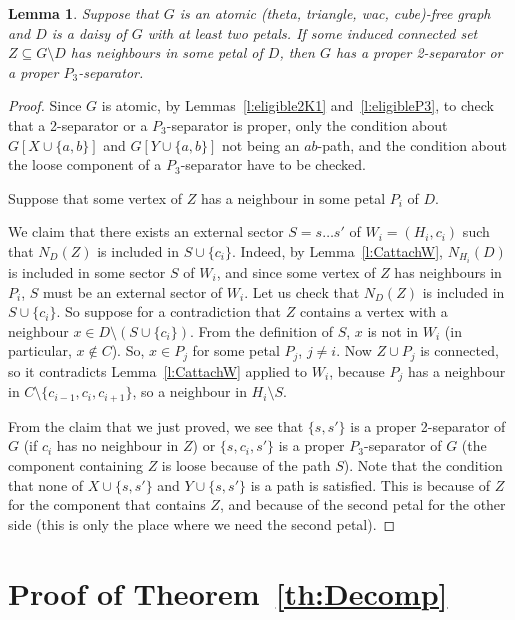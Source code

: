 \documentclass[11pt]{article}
\newtheorem{lemma}[theo]{Lemma}
\newcommand{\sm}{\setminus}
\begin{document}
\begin{lemma}
  \label{l:twoPetals}
  Suppose that $G$ is an atomic (theta, triangle, wac, cube)-free
  graph and $D$ is a daisy of $G$ with at least two petals.  If
  some induced connected set $Z\subseteq G \sm D$ has neighbours in some petal
  of $D$, then $G$ has a proper 2-separator or a proper
  $P_3$-separator.
\end{lemma}


\begin{proof}
  Since $G$ is atomic, by Lemmas~\ref{l:eligible2K1}
  and~\ref{l:eligibleP3}, to check that a 2-separator or a
  $P_3$-separator is proper, only the condition about
  $G[X\cup \{a, b\}]$ and $G[Y \cup \{a, b\}]$ not being an $ab$-path,
  and the condition about the loose component of a $P_3$-separator
  have to be checked.

  
  Suppose that some vertex of $Z$ has a neighbour in some petal $P_i$
  of $D$.

  We claim that there exists an external sector $S = s\dots s'$ of
  $W_i = (H_i, c_i)$ such that $N_{D}(Z)$ is included in $S\cup \{c_i\}$. Indeed, by
  Lemma~\ref{l:CattachW}, $N_{H_i}(D)$ is included in some sector $S$
  of $W_i$, and since some vertex of $Z$ has neighbours in $P_i$, $S$
  must be an external sector of $W_i$.  Let us check that $N_D(Z)$ is
  included in $S\cup \{c_i\}$.  So suppose for a contradiction that
  $Z$ contains a vertex with a neighbour $x\in D \sm (S\cup \{c_i\})$.
  From the definition of $S$, $x$ is not in $W_i$ (in particular,
  $x\notin C$).  So, $x\in P_j$ for some petal $P_j$, $j\neq i$.  Now
  $Z\cup P_j$ is connected, so it contradicts Lemma~\ref{l:CattachW}
  applied to $W_i$, because $P_j$ has a neighbour in
  $C \sm \{c_{i-1}, c_{i}, c_{i+1}\}$, so a neighbour in $H_i \sm S$.

  From the claim that we just proved, we see that $\{s, s'\}$ is a
  proper 2-separator of $G$ (if $c_i$ has no neighbour in $Z$) or
  $\{s, c_i, s'\}$ is a proper $P_3$-separator of $G$ (the component
  containing $Z$ is loose because of the path $S$).  Note that the
  condition that none of $X\cup \{s, s'\}$ and $Y\cup \{s, s'\}$ is a
  path is satisfied.  This is because of $Z$ for the component that
  contains $Z$, and because of the second petal for the other side
  (this is only the place where we need the second petal).
\end{proof}


\section{Proof of Theorem~\ref{th:Decomp}}
\label{sec:proofs}
\end{document}
